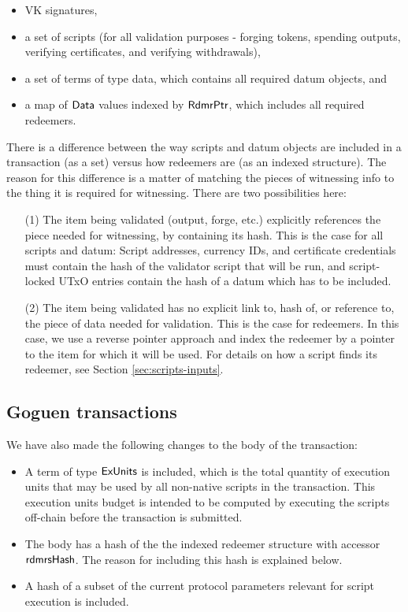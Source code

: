 \begin{itemize}
  \item VK signatures,
  \item a set of scripts (for all
  validation purposes - forging tokens, spending outputs, verifying certificates, and
  verifying withdrawals),
  \item a set of terms of type data, which contains all required datum objects, and
  \item a map of $\mathsf{Data}$ values indexed by $\mathsf{RdmrPtr}$, which includes all
  required redeemers.
\end{itemize}

There is a difference between the way scripts and datum objects are included in
a transaction (as a set) versus how redeemers are
(as an indexed structure). The reason for this difference is a matter of matching
the pieces of witnessing info to the thing it is required for witnessing. There
are two possibilities here:

\begin{itemize}
  \item[(1)] The item being validated (output, forge, etc.) explicitly references
  the piece needed for witnessing, by containing its hash.
  This is the case for all scripts and datum:
  Script addresses, currency IDs, and certificate credentials must contain
  the hash of the validator script that will be run, and script-locked UTxO entries
  contain the hash of a datum which has to be included.

  \item[(2)] The item being validated has no explicit link to, hash of, or
  reference to, the piece of data needed for validation. This is the case for redeemers.
  In this case, we use a reverse pointer approach and
  index the redeemer by a pointer to the item for which it will be used.
  For details on how a script finds its redeemer, see Section \ref{sec:scripts-inputs}.
\end{itemize}

\subsection{Goguen transactions}
We have also made the following changes to
the body of the transaction:

\begin{itemize}
  \item A term of type $\mathsf{ExUnits}$ is included, which is the total quantity of execution units
  that may be used by all non-native scripts in the transaction.
  This execution units budget is intended to be computed
  by executing the scripts off-chain before the transaction is submitted.
  \item The body has a hash of the the indexed redeemer structure
    with accessor $\mathsf{rdmrsHash}$. The reason for including this hash is explained below.
  \item A hash of a subset of the current protocol parameters relevant for script execution is included.
\end{itemize}


